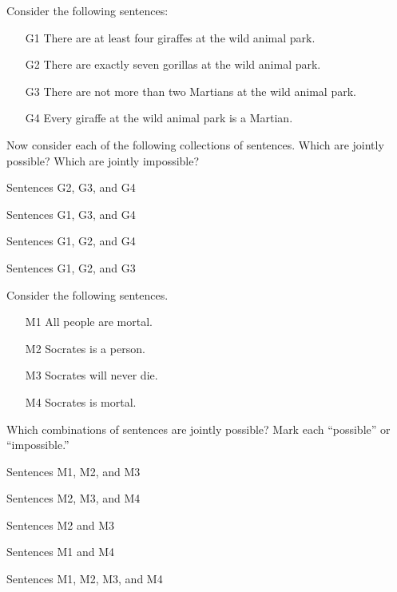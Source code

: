 \noindent
\problempart 
\label{pr.MartianGiraffes}
Consider the following sentences: 
\begin{enumerate}%
\item[G1] \label{itm:at_least_four}There are at least four giraffes at the wild animal park.
\item[G2] \label{itm:exactly_seven} There are exactly seven gorillas at the wild animal park.
\item[G3] \label{itm:not_more_than_two} There are not more than two Martians at the wild animal park.
\item[G4] \label{itm:martians} Every giraffe at the wild animal park is a Martian.
\end{enumerate}

Now consider each of the following collections of sentences. Which are jointly possible? Which are jointly impossible?
\begin{earg}
\item Sentences G2, G3, and G4
\hfill {}
\item Sentences G1, G3, and G4
\hfill {}
\item Sentences G1, G2, and G4
\hfill {}
\item Sentences G1, G2, and G3
\hfill {}
\end{earg}

\problempart Consider the following sentences.
\begin{enumerate}%
\item[M1] \label{itm:allmortal} All people are mortal.
\item[M2] \label{itm:socperson} Socrates is a person.
\item[M3] \label{itm:socnotdie} Socrates will never die.
\item[M4] \label{itm:socmortal} Socrates is mortal.
\end{enumerate}
Which combinations of sentences are jointly possible? Mark each ``possible'' or ``impossible.''
\begin{earg}
\item Sentences M1, M2, and M3
\item Sentences M2, M3, and M4
\item Sentences M2 and M3
\item Sentences M1 and M4
\item Sentences M1, M2, M3, and M4
\end{earg}

